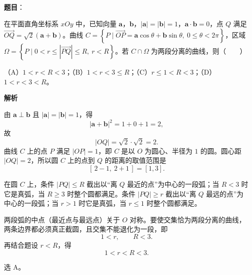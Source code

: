 \begin{answer}

\textbf{题目}：

在平面直角坐标系 $xOy$ 中，已知向量 $\boldsymbol a$，$\boldsymbol b$，$|\boldsymbol a|=|\boldsymbol b|=1$，$\boldsymbol a\cdot\boldsymbol b=0$，点 $Q$ 满足 $\overrightarrow{OQ}=\sqrt2(\boldsymbol a+\boldsymbol b)$。曲线 $C=\left\{P\mid \overrightarrow{OP}=\boldsymbol a\cos\theta+\boldsymbol b\sin\theta,\ 0\leqslant\theta<2\pi\right\}$，区域 $\Omega=\left\{P\mid 0<r\leqslant|\overrightarrow{PQ}|\leqslant R,\ r<R\right\}$。若 $C\cap\Omega$ 为两段分离的曲线，则\mbox{（　　）}

（A）$1<r<R<3$；（B）$1<r<3\leqslant R$；（C）$r\leqslant1<R<3$；（D）$1<r<3<R$。

\textbf{解析}

由 $\boldsymbol a\perp\boldsymbol b$ 且 $|\boldsymbol a|=|\boldsymbol b|=1$，得
\nopagebreak[4]
\[|\boldsymbol a+\boldsymbol b|^2=1+0+1=2,\]
故
\nopagebreak[4]
\[|OQ|=\sqrt2\cdot\sqrt2=2 .\]
曲线 $C$ 上的点 $P$ 满足 $|OP|=1$，即 $C$ 是以 $O$ 为圆心、半径为 $1$ 的圆。圆心距 $|OQ|=2$，所以圆 $C$ 上的点到 $Q$ 的距离的取值范围是
\nopagebreak[4]
\[[\,2-1,\ 2+1\,]=[1,3].\]

在圆 $C$ 上，条件 $|PQ|\leqslant R$ 截出以“离 $Q$ 最近的点”为中心的一段弧；当 $R<3$ 时它是真弧，当 $R\geqslant3$ 时整个圆都满足。条件 $|PQ|\geqslant r$ 截出以“离 $Q$ 最远的点”为中心的一段弧；当 $r>1$ 时它是真弧，当 $r\leqslant1$ 时整个圆都满足。

两段弧的中点（最近点与最远点）关于 $O$ 对称。要使交集恰为两段分离的曲线，两条边界都必须真正截圆，且交集不能退化为一段，即
\nopagebreak[4]
\[1<r,\qquad R<3 .\]
再结合题设 $r<R$，得
\nopagebreak[4]
\[1<r<R<3 .\]

选 A。


\end{answer}
